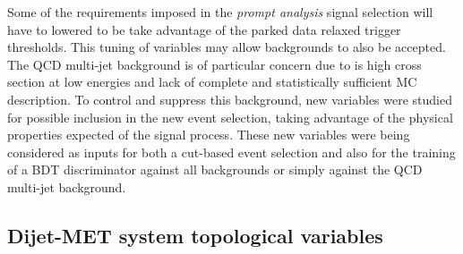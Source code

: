 Some of the requirements imposed in the \textit{prompt analysis} signal selection will have to lowered to be take advantage of the parked data relaxed trigger thresholds. This tuning of variables may allow backgrounds to also be accepted. The \gls{QCD} multi-jet background is of particular concern due to is high cross section  at low energies and lack of complete and statistically sufficient \gls{MC} description. To control and suppress this  background, new variables were studied for possible inclusion in the new event selection, taking advantage of the physical properties expected of the signal process. These new variables were being considered as inputs for both a cut-based event selection and also for the training of a \gls{BDT} discriminator against all backgrounds or simply against the \gls{QCD} multi-jet background.

\subsection{Dijet-MET system topological variables}
\label{SECTION:PreparationParkedDataAnalysis_DijetMETSystemVars}
% 
% 
% 
% 
%
%


